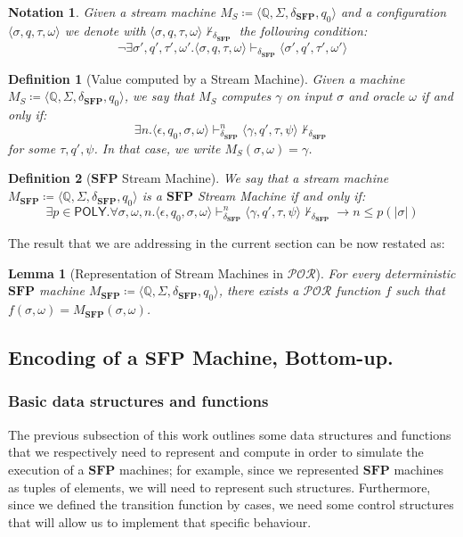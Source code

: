 \documentclass[10pt]{amsart}
\newcommand{\POLY}{\mathsf{POLY}}
\newcommand{\SFP}{\mathbf{SFP}}
\newcommand{\POR}{\mathcal{POR}}
\newcommand{\funone}{f}
\newcommand{\QQ}{\mathbb{Q}}
\newcommand{\ms}{q}
\newcommand{\msf}{q'}
\newcommand{\msi}[1]{q_{#1}}
\newcommand{\mcan}{M_{S}}
\newcommand{\msfp}{M_{\SFP}}
\newcommand{\genm}{\mcan\coloneqq \langle \QQ, \Sigma, \TT, \msi0 \rangle}
\newcommand{\gensfp}{\msfp\coloneqq \langle \QQ, \Sigma, \TT, \msi0 \rangle}
\newcommand{\sone}{\sigma}
\newcommand{\stwo}{\tau}
\newcommand{\sthree}{\gamma}
\newcommand{\oone}{\omega}
\newcommand{\otwo}{\psi}
\newcommand{\mcnf}{\langle \sone, \ms, \stwo, \oone \rangle}
\newcommand{\mcnfi}{\langle \epsilon, \msi0, \sone, \oone \rangle}
\newcommand{\mcnfs}{\langle \sthree, \msf, \stwo, \otwo \rangle}
\newcommand{\mcnff}{\langle \sone', \msf, \stwo', \oone' \rangle}
\newcommand{\rcs}[1]{\vdash_{#1}}
\newcommand{\Rcs}[2]{\vdash_{#1}^{#2}}
\newcommand{\TT}{\delta_\SFP}
\newtheorem{defn}{Definition}
\newtheorem{lemma}{Lemma}
\newtheorem{notation}{Notation}
\begin{document}
\begin{notation}
Given a stream machine $\genm$ and a configuration $\mcnf$ we denote with $\mcnf\not\rcs\TT$ the following condition:
\[
\lnot \exists \sone', \msf, \stwo',\oone'. \mcnf \rcs\TT \mcnff
\]
\end{notation}

\begin{defn}[Value computed by a Stream Machine]
Given a machine $\genm$, we say that $\mcan$ computes $\sthree$ on input $\sone$ and oracle $\oone$ if and only if:
\[
\exists n. \mcnfi \Rcs\TT n \mcnfs \not\rcs\TT
\]
for some $\stwo, \msf, \otwo$. In that case, we write $\mcan(\sone, \oone)=\sthree$.
\end{defn}

\begin{defn}[$\SFP$ Stream Machine]
We say that a stream machine $\gensfp$ is a $\SFP$ Stream Machine if and only if:
\[
\exists p \in \POLY.\forall \sone, \oone, n. \mcnfi \Rcs\TT n \mcnfs \not\rcs\TT \to n \le p(|\sone|)
\]
\end{defn}

The result that we are addressing in the current section can be now restated as:

\begin{lemma}[Representation of Stream Machines in $\POR$]
\label{lemma:smtopor}
For every deterministic $\SFP$ machine $\gensfp$, there exists a $\POR$ function $\funone$ such that $\funone(\sone, \oone)=\msfp(\sone, \oone)$.
\end{lemma}

\subsection{Encoding of a $\SFP$ Machine, Bottom-up.}
\label{sec:encoding}
\subsubsection{Basic data structures and functions}
\label{sec:basicdataandfun}

The previous subsection of this work outlines some data structures and functions that we respectively need to represent and compute in order to simulate the execution of a $\SFP$ machines; for example, since we represented $\SFP$ machines as tuples of elements, we will need to represent such structures. Furthermore, since we defined the transition function by cases, we need some control structures that will allow us to implement that specific behaviour.
\end{document}
